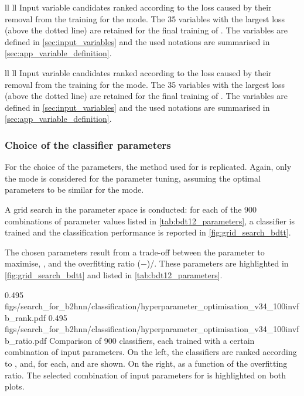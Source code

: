 {ll}
{}
{ll}
{}
{
Input variable candidates ranked according to the \auctest loss caused by their removal from the \bdtt training for the \BKpnn mode.
The 35 variables with the largest loss (above the dotted line) are retained for the final training of \bdtt.
The variables are defined in \cref{sec:input_variables} and the used notations are summarised in \cref{sec:app_variable_definition}.
}

{ll}
{}
{ll}
{}
{
Input variable candidates ranked according to the \auctest loss caused by their removal from the \bdtt training for the \BKznn mode.
The 35 variables with the largest loss (above the dotted line) are retained for the final training of \bdtt.
The variables are defined in \cref{sec:input_variables} and the used notations are summarised in \cref{sec:app_variable_definition}.
}
\subsubsection*{Choice of the classifier parameters}
For the choice of the \bdtt parameters, the method used for \bdto is replicated.
Again, only the \BKpnn mode is considered for the parameter tuning, assuming the optimal parameters to be similar for the \BKznn mode.

A grid search in the parameter space is conducted: for each of the 900 combinations of parameter values listed in \cref{tab:bdt12_parameters}, a classifier is trained and the classification performance is reported in \cref{fig:grid_search_bdtt}.

The chosen parameters result from a trade-off between the parameter to maximise, \auctest, and the overfitting ratio (\auctrain\!\!$-$\auctest)/\auctest.
These parameters are highlighted in \cref{fig:grid_search_bdtt} and listed in \cref{tab:bdt12_parameters}.

{0.495}
{figs/search_for_b2hnn/classification/hyperparameter_optimisation_v34_100invfb_rank.pdf}
{0.495}
{figs/search_for_b2hnn/classification/hyperparameter_optimisation_v34_100invfb_ratio.pdf}
{
Comparison of 900 classifiers, each trained with a certain combination of input parameters.
On the left, the classifiers are ranked according to \auctrain, and, for each, \auctrain and \auctest are shown.
On the right, \auctest as a function of the overfitting ratio.
The selected combination of input parameters for \bdtt is highlighted on both plots.
}

